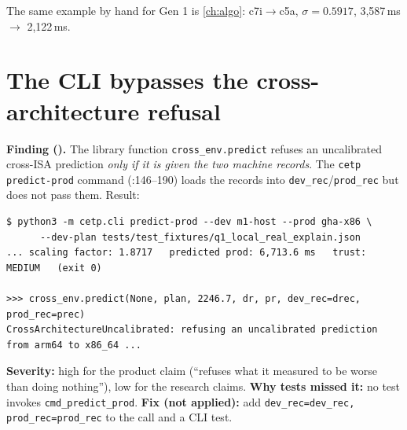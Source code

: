 \begin{notebox}
The same example by hand for Gen 1 is \cref{ch:algo}: c7i$\to$c5a, $\sigma=0.5917$, 3{,}587\,ms $\to$ 2{,}122\,ms.
\end{notebox}

\section{The CLI bypasses the cross-architecture refusal}\label{sec:cli-bypass}
\textbf{Finding (\evRUN).} The library function \texttt{cross\_env.predict} refuses an uncalibrated cross-ISA prediction \emph{only if it is given the two machine
records}. The \texttt{cetp predict-prod} command (:146--190) loads the records into \texttt{dev\_rec}/\texttt{prod\_rec} but does not pass them. Result:
\begin{lstlisting}[language={},mathescape=false,caption={Reproduction (read-only; no repository file was modified).}]
$ python3 -m cetp.cli predict-prod --dev m1-host --prod gha-x86 \
      --dev-plan tests/test_fixtures/q1_local_real_explain.json
... scaling factor: 1.8717   predicted prod: 6,713.6 ms   trust: MEDIUM   (exit 0)

>>> cross_env.predict(None, plan, 2246.7, dr, pr, dev_rec=drec, prod_rec=prec)
CrossArchitectureUncalibrated: refusing an uncalibrated prediction from arm64 to x86_64 ...
\end{lstlisting}
\textbf{Severity:} high for the product claim (``refuses what it measured to be worse than doing nothing''), low for the research claims. \textbf{Why tests missed it:} no test invokes
\texttt{cmd\_predict\_prod}. \textbf{Fix (not applied):} add \texttt{dev\_rec=dev\_rec, prod\_rec=prod\_rec} to the call and a CLI test.
